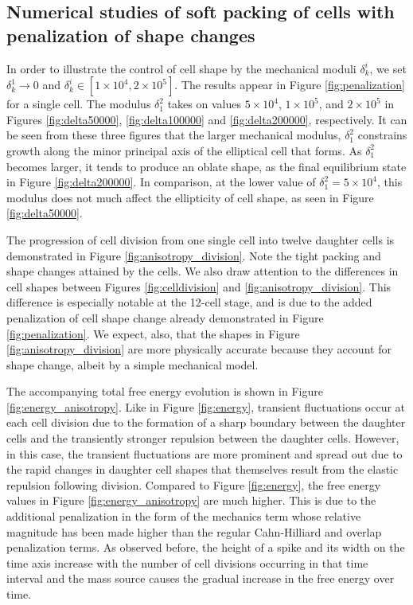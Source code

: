 \documentclass{article}
\begin{document}
\subsection{Numerical studies of soft packing of cells with penalization of shape changes}
\label{sec:anisotropy_study}
In order to illustrate the control of cell shape  by the mechanical moduli $\delta^i_k$, we set $\delta^1_k \to 0$ and $\delta^i_k \in [1\times 10^4, 2\times 10^5]$. The results appear in Figure \ref{fig:penalization} for a single cell. The modulus $\delta^2_1$ takes on values $5\times 10^4$, $1\times 10^5$, and $2\times 10^5$ in Figures \ref{fig:delta50000}, \ref{fig:delta100000} and \ref{fig:delta200000}, respectively. It can be seen from these three figures that the larger mechanical modulus, $\delta^2_1$ constrains growth along the minor principal axis of the elliptical cell that forms. As $\delta^2_1$ becomes larger, it tends to produce an oblate shape, as the final equilibrium state in Figure \ref{fig:delta200000}. In comparison, at the lower value of $\delta^2_1 = 5\times 10^4$, this modulus does not much affect the ellipticity of cell shape, as seen in Figure \ref{fig:delta50000}. 

The progression of cell division from one single cell into twelve daughter cells is demonstrated in Figure \ref{fig:anisotropy_division}. Note the tight packing and shape changes attained by the cells. We also draw attention to the differences in cell shapes between Figures \ref{fig:celldivision} and \ref{fig:anisotropy_division}. This difference is especially notable at the 12-cell stage, and is  due to the added penalization of cell shape change already demonstrated in Figure \ref{fig:penalization}. We expect, also, that the shapes in Figure \ref{fig:anisotropy_division} are more physically accurate because they account for shape change, albeit by a simple mechanical model. 

The accompanying total free energy evolution is shown in Figure \ref{fig:energy_anisotropy}. Like in Figure \ref{fig:energy}, transient fluctuations occur at each cell division due to the formation of a sharp boundary between the daughter cells and the transiently stronger repulsion between the daughter cells. However, in this case, the transient fluctuations are more prominent and spread out due to the rapid changes in daughter cell shapes that themselves result from the elastic repulsion following division. Compared to Figure \ref{fig:energy}, the free energy values in Figure \ref{fig:energy_anisotropy} are much higher. This is due to the additional penalization in the form of the mechanics term whose relative magnitude has been made higher than the regular Cahn-Hilliard and overlap penalization terms. As observed before, the height of a spike and its width on the time axis increase with the number of cell divisions occurring in that time interval and the mass source causes the gradual increase in the free energy over time.
\end{document}
